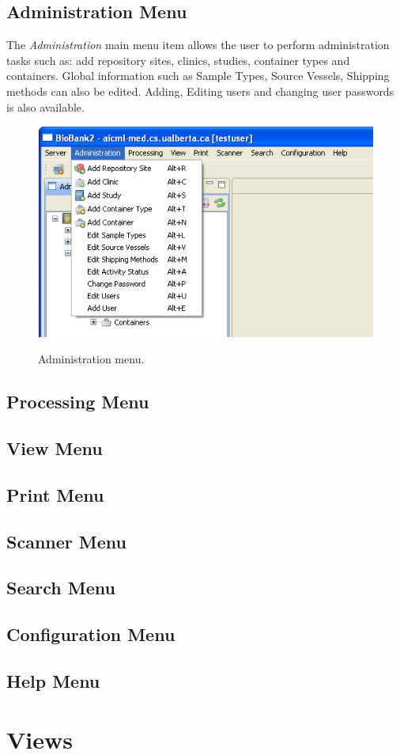 \subsection{Administration Menu}
The \emph{Administration} main menu item allows the user to perform
administration tasks such as: add repository sites, clinics, studies, container
types and containers. Global information such as Sample Types, Source Vessels,
Shipping methods can also be edited. Adding, Editing users and changing user
passwords is also available.
    \begin{figure}[H]
      \centering
      \scalebox{0.5}
      { \includegraphics*{screenshots/overview/main_menu_administration} }
      \caption{Administration menu.}
      \label{fig:main_menu_administration}
    \end{figure}
\begin{description}
  \item[]
\end{description}
\subsection{Processing Menu}
\subsection{View Menu}
\subsection{Print Menu}
\subsection{Scanner Menu}
\subsection{Search Menu}
\subsection{Configuration Menu}
\subsection{Help Menu}

\section{Views}
\label{sec:application_views}
